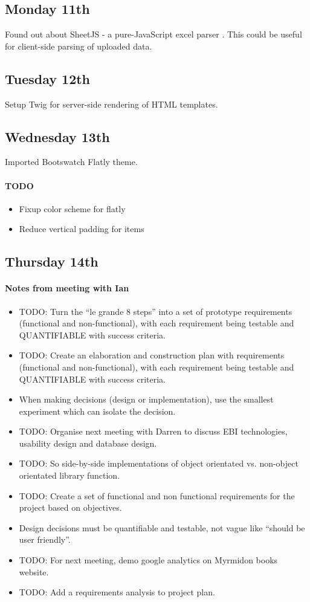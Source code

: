 \subsection{Monday 11th}
Found out about SheetJS - a pure-JavaScript excel parser
\cite{SheetJS2013}. This could be useful for client-side parsing of uploaded
data.

\subsection{Tuesday 12th}
Setup Twig for server-side rendering of HTML templates.

\subsection{Wednesday 13th}
Imported Bootswatch Flatly theme.

\paragraph{TODO}
\begin{itemize}
\item Fixup color scheme for flatly
\item Reduce vertical padding for items
\end{itemize}

\subsection{Thursday 14th}
\paragraph{Notes from meeting with Ian}
\begin{itemize}
\item TODO: Turn the ``le grande 8 steps'' into a set of prototype requirements
  (functional and non-functional), with each requirement being testable and
  QUANTIFIABLE with success criteria.
\item TODO: Create an elaboration and construction plan with requirements
  (functional and non-functional), with each requirement being testable and
  QUANTIFIABLE with success criteria.
\item When making decisions (design or implementation), use the smallest
  experiment which can isolate the decision.
\item TODO: Organise next meeting with Darren to discuss EBI technologies,
  usability design and database design.
\item TODO: So side-by-side implementations of object orientated vs. non-object
  orientated library function.
\item TODO: Create a set of functional and non functional requirements for the
  project based on objectives.
\item Design decisions must be quantifiable and testable, not vague like
  ``should be user friendly''.
\item TODO: For next meeting, demo google analytics on Myrmidon books website.
\item TODO: Add a requirements analysis to project plan.
\end{itemize}
